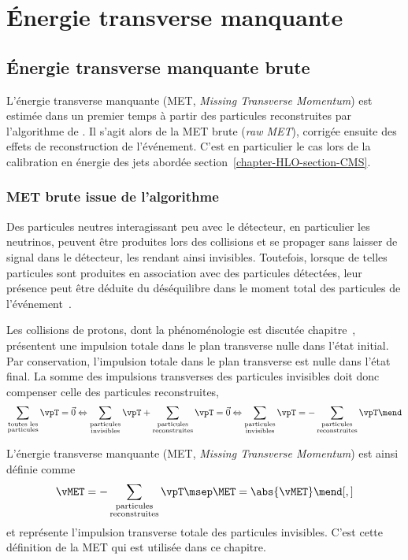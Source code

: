 \section{Énergie transverse manquante}\label{chapter-HLO-section-MET}
\subsection{Énergie transverse manquante brute}
L'énergie transverse manquante (MET, \emph{Missing Transverse Momentum}) est estimée dans un premier temps à partir des particules reconstruites par l'algorithme de \PF.
Il s'agit alors de la MET \og brute \fg{} (\emph{raw MET}), corrigée ensuite des effets de reconstruction de l'événement.
C'est en particulier le cas lors de la calibration en énergie des jets abordée section~\ref{chapter-HLO-section-CMS}.
\subsubsection{MET brute issue de l'algorithme \PF}
Des particules neutres interagissant peu avec le détecteur, en particulier les neutrinos, peuvent être produites lors des collisions et se propager sans laisser de signal dans le détecteur, les rendant ainsi invisibles.
Toutefois, lorsque de telles particules sont produites en association avec des particules détectées, leur présence peut être déduite du déséquilibre dans le moment total des particules de l'événement~\cite{CMS-PAS-JME-17-001}.
\par Les collisions de protons, dont la phénoménologie est discutée chapitre~, présentent une impulsion totale dans le plan transverse nulle dans l'état initial.
Par conservation, l'impulsion totale dans le plan transverse est nulle dans l'état final.
La somme des impulsions transverses des particules invisibles doit donc compenser celle des particules reconstruites, \ie
\begin{equation}
\sum_{\substack{\text{toutes les}\\\text{particules}}} \vpT = \vec{0}
\Leftrightarrow
\sum_{\substack{\text{particules}\\\text{invisibles}}} \vpT + \sum_{\substack{\text{particules}\\\text{reconstruites}}} \vpT = \vec{0}
\Leftrightarrow
\sum_{\substack{\text{particules}\\\text{invisibles}}} \vpT = -\sum_{\substack{\text{particules}\\\text{reconstruites}}} \vpT \mend
\end{equation}
\par L'énergie transverse manquante (MET, \emph{Missing Transverse Momentum}) est ainsi définie comme
\begin{equation}
\vMET = -\sum_{\substack{\text{particules}\\\text{reconstruites}}} \vpT
\msep
\MET = \abs{\vMET}
\mend[,]
\end{equation}
et représente l'impulsion transverse totale des particules invisibles.
C'est cette définition de la MET qui est utilisée dans ce chapitre.
